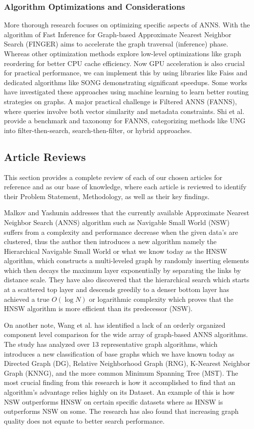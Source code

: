 \documentclass[conference]{IEEEtran}
\begin{document}
\subsubsection{Algorithm Optimizations and Considerations}
More thorough research focuses on optimizing specific aspects of ANNS. With the algorithm of Fast Inference for Graph-based Approximate Nearest Neighbor Search (FINGER) aims to accelerate the graph traversal (inference) phase. Whereas other optimization methods explore low-level optimizations like graph reordering for better CPU cache efficiency. Now GPU acceleration is also crucial for practical performance, we can implement this by using libraries like Faiss and dedicated algorithms like SONG demonstrating significant speedups. Some works have investigated these approaches using machine learning to learn better routing strategies on graphs. A major practical challenge is Filtered ANNS (FANNS), where queries involve both vector similarity and metadata constraints. Shi et al. provide a benchmark and taxonomy for FANNS, categorizing methods like UNG into filter-then-search, search-then-filter, or hybrid approaches.

\subsection{Article Reviews}
This section provides a complete review of each of our chosen articles for reference and as our base of knowledge, where each article is reviewed to identify their Problem Statement, Methodology, as well as their key findings.

Malkov and Yashunin \cite{malkov2020} addresses that the currently available Approximate Nearest Neighbor Search (ANNS) algorithm such as Navigable Small World (NSW) suffers from a complexity and performance decrease when the given data's are clustered, thus the author then introduces a new algorithm namely the Hierarchical Navigable Small World or what we know today as the HNSW algorithm, which constructs a multi-leveled graph by randomly inserting elements which then decays the maximum layer exponentially by separating the links by distance scale. They have also discovered that the hierarchical search which starts at a scattered top layer and descends greedily to a denser bottom layer has achieved a true $O(\log N)$ or logarithmic complexity which proves that the HNSW algorithm is more efficient than its predecessor (NSW).

On another note, Wang et al. \cite{wang2021} has identified a lack of an orderly organized component level comparison for the wide array of graph-based ANNS algorithms. The study has analyzed over 13 representative graph algorithms, which introduces a new classification of base graphs which we have known today as Directed Graph (DG), Relative Neighborhood Graph (RNG), K-Nearest Neighbor Graph (KNNG), and the more common Minimum Spanning Tree (MST). The most crucial finding from this research is how it accomplished to find that an algorithm's advantage relies highly on its Dataset. An example of this is how NSW outperforms HNSW on certain specific datasets where as HNSW is outperforms NSW on some. The research has also found that increasing graph quality does not equate to better search performance.
\end{document}
